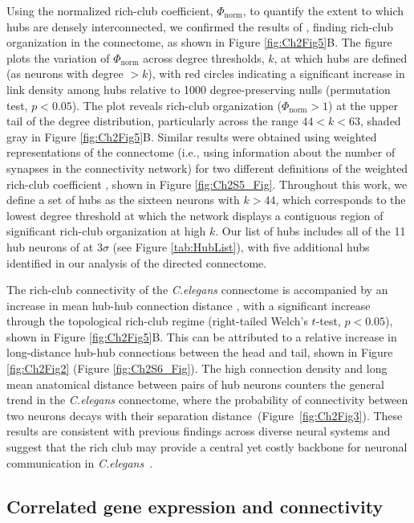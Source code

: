 Using the normalized rich-club coefficient, $\Phi_\mathrm{norm}$, to quantify the extent to which hubs are densely interconnected, we confirmed the results of  
\citet{Towlson2013}, finding rich-club organization in the connectome, as shown in Figure \ref{fig:Ch2Fig5}B.
The figure plots the variation of $\Phi_\mathrm{norm}$ across degree thresholds, $k$, at which hubs are defined (as neurons with degree $>k$), with red circles indicating a significant increase in link density among hubs relative to 1000 degree-preserving nulls (permutation test, $p < 0.05$).
The plot reveals rich-club organization ($\Phi_\mathrm{norm} > 1$) at the upper tail of the degree distribution, particularly across the range $44 < k < 63$, shaded gray in Figure \ref{fig:Ch2Fig5}B.
Similar results were obtained using weighted representations of the connectome (i.e., using information about the number of synapses in the connectivity network) for two different definitions of the weighted rich-club coefficient \citep{Opsahl2008}, shown in Figure \ref{fig:Ch2S5_Fig}.
Throughout this work, we define a set of hubs as the sixteen neurons with $k > 44$, which corresponds to the lowest degree threshold at which the network displays a contiguous region of significant rich-club organization at high $k$.
Our list of hubs includes all of the 11 hub neurons of \citet{Towlson2013} at $3 \sigma$ (see Figure \ref{tab:HubList}), with five additional hubs identified in our analysis of the directed connectome.

The rich-club connectivity of the \emph{C.elegans} connectome is accompanied by an increase in mean hub-hub connection distance \citep{Towlson2013}, with a significant increase through the topological rich-club regime (right-tailed Welch's $t$-test, $p < 0.05$), shown in Figure \ref{fig:Ch2Fig5}B.
This can be attributed to a relative increase in long-distance hub-hub connections between the head and tail, shown in Figure \ref{fig:Ch2Fig2} (Figure  \ref{fig:Ch2S6_Fig}).
The high connection density and long mean anatomical distance between pairs of hub neurons counters the general trend in the \emph{C.elegans} connectome, where the probability of connectivity between two neurons decays with their separation \mbox{distance (Figure \ref{fig:Ch2Fig3})}.
These results are consistent with previous findings across diverse neural systems and suggest that the rich club may provide a central yet costly backbone for neuronal communication in \mbox{\emph{C.elegans} \citep{VandenHeuvel2012, Towlson2013}}.

\subsection{Correlated gene expression and connectivity}

